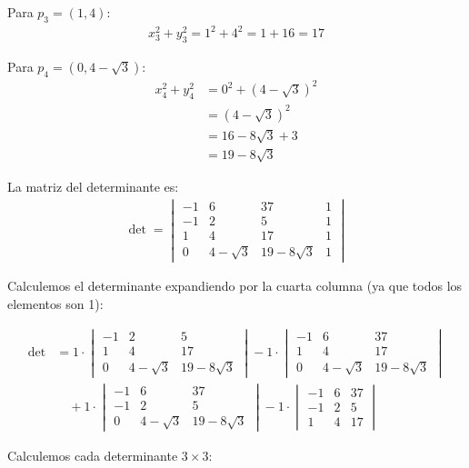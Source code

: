 \documentclass{article}
\begin{document}
Para $p_3 = (1, 4)$:
\begin{align}
x_3^2 + y_3^2 = 1^2 + 4^2 = 1 + 16 = 17
\end{align}

Para $p_4 = (0, 4 - \sqrt{3})$:
\begin{align}
x_4^2 + y_4^2 &= 0^2 + (4 - \sqrt{3})^2 \\
&= (4 - \sqrt{3})^2 \\
&= 16 - 8\sqrt{3} + 3 \\
&= 19 - 8\sqrt{3}
\end{align}

La matriz del determinante es:
\begin{align}
\det = \begin{vmatrix}
-1 & 6 & 37 & 1 \\
-1 & 2 & 5 & 1 \\
1 & 4 & 17 & 1 \\
0 & 4-\sqrt{3} & 19-8\sqrt{3} & 1
\end{vmatrix}
\end{align}

Calculemos el determinante expandiendo por la cuarta columna (ya que todos los elementos son 1):

\begin{align}
\det &= 1 \cdot \begin{vmatrix}
-1 & 2 & 5 \\
1 & 4 & 17 \\
0 & 4-\sqrt{3} & 19-8\sqrt{3}
\end{vmatrix} - 1 \cdot \begin{vmatrix}
-1 & 6 & 37 \\
1 & 4 & 17 \\
0 & 4-\sqrt{3} & 19-8\sqrt{3}
\end{vmatrix} \\
&\quad + 1 \cdot \begin{vmatrix}
-1 & 6 & 37 \\
-1 & 2 & 5 \\
0 & 4-\sqrt{3} & 19-8\sqrt{3}
\end{vmatrix} - 1 \cdot \begin{vmatrix}
-1 & 6 & 37 \\
-1 & 2 & 5 \\
1 & 4 & 17
\end{vmatrix}
\end{align}

Calculemos cada determinante $3 \times 3$:
\end{document}
